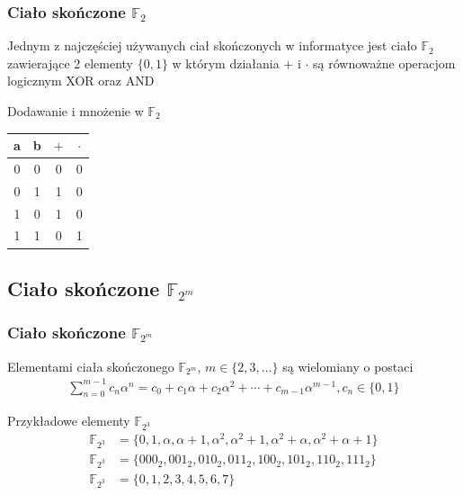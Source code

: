 \documentclass{beamer}
\begin{document}
\begin{frame}
	\frametitle{Ciało skończone $\mathbb{F}_2$}
	Jednym z najczęściej używanych ciał skończonych w informatyce jest ciało
	$\mathbb{F}_2$ zawierające 2 elementy $\{ 0, 1 \}$ w którym działania $+$ i
	$\cdot$ są równoważne operacjom logicznym XOR oraz AND
    \begin{exampleblock}{Dodawanie i mnożenie w $\mathbb{F}_2$}
        \begin{table}
            \begin{tabular}{c c | c c}
                \toprule
                a & b & $+$ & $\cdot$ \\
                \midrule
                0 & 0 & 0 & 0 \\
                \midrule
                0 & 1 & 1 & 0 \\
                \midrule
                1 & 0 & 1 & 0 \\
                \midrule
                1 & 1 & 0 & 1 \\
                \bottomrule
            \end{tabular}
        \end{table}
    \end{exampleblock}
\end{frame}

\subsection{Ciało skończone \texorpdfstring{$\mathbb{F}_{2^m}$}{F\_2**m}}

\begin{frame}
	\frametitle{Ciało skończone $\mathbb{F}_{2^m}$}
	Elementami ciała skończonego $\mathbb{F}_{2^m}$,  $m \in \{ 2,3, \ldots \}$ są wielomiany o postaci
	\begin{align*}
		\sum_{n=0}^{m-1} c_n \alpha^n = c_{0} + c_{1}\alpha + c_{2}\alpha^{2} + \cdots + c_{m-1}\alpha^{m-1},
		c_{n} \in \{ 0, 1 \}
	\end{align*}
	\begin{exampleblock}{Przykładowe elementy $\mathbb{F}_{2^3}$}
		\begin{align*}
				\mathbb{F}_{2^3} &= \{ 0, 1, \alpha, \alpha + 1, \alpha^2, \alpha^2 + 1, \alpha^2 + \alpha, \alpha^2 + \alpha + 1 \} \\
				\mathbb{F}_{2^3} &= \{ 000_2, 001_2, 010_2, 011_2, 100_2, 101_2, 110_2, 111_2 \} \\
				\mathbb{F}_{2^3} &= \{ 0, 1, 2, 3, 4, 5, 6, 7 \}
		\end{align*}
	\end{exampleblock}
\end{frame}
\end{document}
